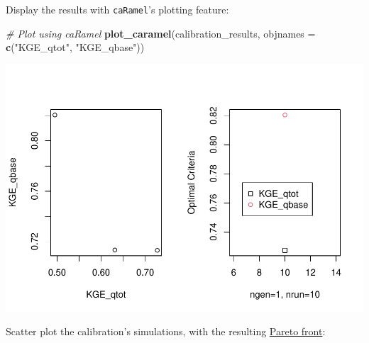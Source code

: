\documentclass[
]{book}
\newenvironment{Shaded}{\begin{snugshade}}{\end{snugshade}}
\newcommand{\AttributeTok}[1]{\textcolor[rgb]{0.13,0.29,0.53}{#1}}
\newcommand{\CommentTok}[1]{\textcolor[rgb]{0.56,0.35,0.01}{\textit{#1}}}
\newcommand{\FunctionTok}[1]{\textcolor[rgb]{0.13,0.29,0.53}{\textbf{#1}}}
\newcommand{\NormalTok}[1]{#1}
\newcommand{\StringTok}[1]{\textcolor[rgb]{0.31,0.60,0.02}{#1}}
\begin{document}
Display the results with \texttt{caRamel}'s plotting feature:

\begin{Shaded}
\begin{Highlighting}[]
\CommentTok{\# Plot using caRamel}
\FunctionTok{plot\_caramel}\NormalTok{(calibration\_results, }\AttributeTok{objnames =} \FunctionTok{c}\NormalTok{(}\StringTok{"KGE\_qtot"}\NormalTok{, }\StringTok{"KGE\_qbase"}\NormalTok{))}
\end{Highlighting}
\end{Shaded}

\includegraphics{fig/unnamed-chunk-6-1.pdf}

Scatter plot the calibration's simulations, with the resulting \href{https://en.wikipedia.org/wiki/Pareto_front}{Pareto front}:
\end{document}
